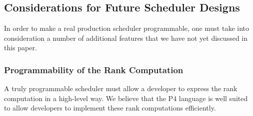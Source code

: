 


\subsection{Considerations for Future Scheduler Designs}
In order to make a real production scheduler programmable, one must take into consideration a number of additional features that we have not yet discussed in this paper.

\subsubsection*{Programmability of the Rank Computation}
A truly programmable scheduler must allow a developer to express the rank computation in a high-level way. We believe that the P4 language is well suited to allow developers to implement these rank computations efficiently.

